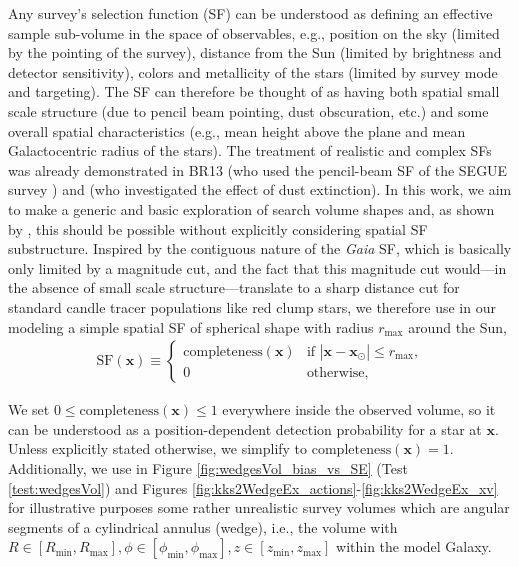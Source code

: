 \documentclass[iop,revtex4,numberedappendix,appendixfloats]{emulateapj}
\newcommand{\vect}[1]{\boldsymbol{#1}}
\begin{document}
Any survey's selection function (SF) can be understood as defining an effective sample sub-volume in the space of observables, e.g., position on the sky (limited by the pointing of the survey), distance from the Sun (limited by brightness and detector sensitivity), colors and metallicity of the stars (limited by survey mode and targeting). The SF can therefore be thought of as having both spatial small scale structure (due to pencil beam pointing, dust obscuration, etc.) and some overall spatial characteristics (e.g., mean height above the plane and mean Galactocentric radius of the stars). The treatment of realistic and complex SFs was already demonstrated in BR13 (who used the pencil-beam SF of the SEGUE survey \citep{2012ApJ...753..148B}) and \citet{2016ApJ...818..130B} (who investigated the effect of dust extinction). In this work, we aim to make a generic and basic exploration of search volume shapes and, as shown by \citet{2016ApJ...818..130B}, this should be possible without explicitly considering spatial SF substructure. Inspired by the contiguous nature of the \emph{Gaia} SF, which is basically only limited by a magnitude cut, and the fact that this magnitude cut would---in the absence of small scale structure---translate to a sharp distance cut for standard candle tracer populations like red clump stars, we therefore use in our modeling a simple spatial SF of spherical shape with radius $r_\text{max}$ around the Sun,
\begin{eqnarray}
\text{SF}(\vect{x}) \equiv \begin{cases}
\text{completeness}(\vect{x}) &\text{if $|\vect{x}-\vect{x}_\odot| \leq r_\text{max}$,}\\
0 & \text{otherwise,}
\end{cases} \label{eq:selectionfunction}
\end{eqnarray}

We set $0 \leq \text{completeness}(\vect{x}) \leq 1$ everywhere inside the observed volume, so it can be understood as a position-dependent detection probability for a star at $\vect{x}$. Unless explicitly stated otherwise, we simplify to $\text{completeness}(\vect{x}) = 1$. Additionally, we use in Figure \ref{fig:wedgesVol_bias_vs_SE} (Test \ref{test:wedgesVol}) and Figures \ref{fig:kks2WedgeEx_actions}-\ref{fig:kks2WedgeEx_xv} for illustrative purposes some rather unrealistic survey volumes which are angular segments of a cylindrical annulus (wedge), i.e., the volume with $R \in [R_\text{min},R_\text{max}],\phi \in [\phi_\text{min},\phi_\text{max}],z \in [z_\text{min},z_\text{max}]$ within the model Galaxy. 

\end{document}
